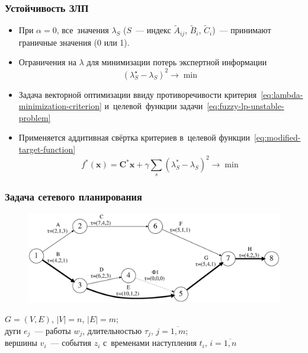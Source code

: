 \documentclass[12pt]{beamer}
\begin{document}
\begin{frame}
  \frametitle{Устойчивость ЗЛП}
  \begin{itemize}
    \item При $\alpha=0$, все~значения $\lambda_S$ ($S$~--- индекс $\tilde A_{ij}$, $\tilde B_i$, $\tilde C_i$)~--- принимают граничные значения (0 или 1). 
    \item Ограничения на $\lambda$ для минимизации потерь экспертной информации
      \begin{equation}
      \label{eq:lambda-minimization-criterion}
        {\left( \lambda_{S}^{\star}-\lambda_S \right)}^2\to \min
      \end{equation}
    \item Задача векторной оптимизации ввиду противоречивости критерия~\eqref{eq:lambda-minimization-criterion} и~целевой~функции задачи~\eqref{eq:fuzzy-lp-unstable-problem}
    \item Применяется аддитивная свёртка критериев в~целевой функции~\eqref{eq:modified-target-function}
      \begin{equation}
      \label{eq:modified-target-function}
        f^{*}\left( \mathbf{x} \right)=\mathbf{C}^{*}\mathbf{x}+\gamma \sum\limits_{s}^{}{\left(\lambda_{S}^{*}-\lambda_S \right)}^{2} \to \min
      \end{equation}
  \end{itemize}
\end{frame}

\begin{frame}
  \frametitle{Задача сетевого планирования}
  \begin{figure}
    \center
    \includegraphics[width=\textwidth]{pplan}
  \end{figure}
  $G=(V,E)$, $\left| V \right|=n$, $\left| E \right|=m$; \\
  дуги $e_j$~--- работы $w_j$, длительностью $\tau_j$, $j=\overline{1,m}$; \\
  вершины $v_i$~--- события $z_i$ с~временами наступления $t_i$, $i=\overline{1,n}$
\end{frame}
\end{document}
